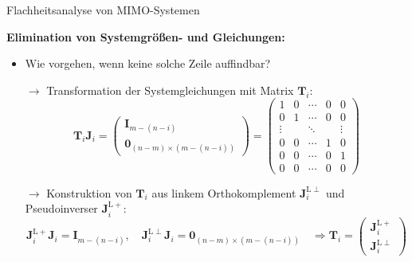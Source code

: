 \documentclass[
	ngerman,
	10pt,				%
	aspectratio=169 	%
]{beamer}
\begin{document}
\begin{frame}[t,fragile,label=Flachheit_4]{\large Flachheitsanalyse von MIMO-Systemen}
	
	\textbf{Elimination von Systemgrößen- und Gleichungen:}
	
	\begin{itemize}
		\item  Wie vorgehen, wenn keine solche Zeile auffindbar?
		\pause
		\item[$\rightarrow$] Transformation der Systemgleichungen mit Matrix $\mathbf{T}_i$: \\
		\begin{equation*}
			\mathbf{T}_i \mathbf{J}_i = 
			\begin{pmatrix}
				\mathbf{I}_{m-(n-i)} \\
				\hline
				\mathbf{0}_{(n-m) \times (m-(n-i))}
			\end{pmatrix}
			=
			\begin{pmatrix}
				1 & 0 & \cdots & 0 & 0 \\
				0 & 1 & \cdots & 0 & 0 \\
				\vdots & & \ddots &  & \vdots \\
				0 & 0 & \cdots & 1 & 0 \\
				0 & 0 & \cdots & 0 & 1 \\
				\hline
				0 & 0 & \cdots & 0 & 0
			\end{pmatrix}
		\end{equation*}
		\pause
		\item[$\rightarrow$] Konstruktion von $\mathbf{T}_i$ aus linkem Orthokomplement $\mathbf{J}_i^{\mathrm{L} \perp}$ und Pseudoinverser $\mathbf{J}_i^{\mathrm{L} +}$: \\
		\begin{equation*}
			\mathbf{J}_i^{\mathrm{L} +} \mathbf{J}_i = \mathbf{I}_{m-(n-i)}, \quad
			\mathbf{J}_i^{\mathrm{L} \perp} \mathbf{J}_i = \mathbf{0}_{(n-m) \times (m-(n-i))} \quad
			\Rightarrow \mathbf{T}_i = 
			\begin{pmatrix}
				\mathbf{J}_i^{\mathrm{L} +} \\
				\mathbf{J}_i^{\mathrm{L} \perp}
			\end{pmatrix}
		\end{equation*}
	\end{itemize}
	
\end{frame}

\end{document}

